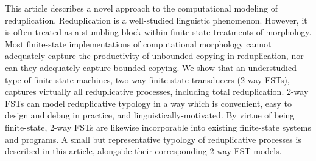 This article describes a novel approach to the computational modeling of reduplication. Reduplication is a well-studied linguistic phenomenon. However, it is often treated as a stumbling block within finite-state treatments of morphology. Most finite-state implementations of computational morphology cannot adequately capture the productivity of unbounded copying in reduplication, nor can they adequately capture bounded copying. We show that an understudied type of finite-state machines, two-way finite-state transducers (2-way FSTs), captures virtually all reduplicative processes, including total reduplication. 2-way FSTs can model    reduplicative typology in a way which is convenient, easy to design and debug in practice, and linguistically-motivated. By virtue of being finite-state, 2-way FSTs are likewise incorporable into existing finite-state systems and programs. A small but representative typology of reduplicative processes is described in this article, alongside their corresponding 2-way FST models.

